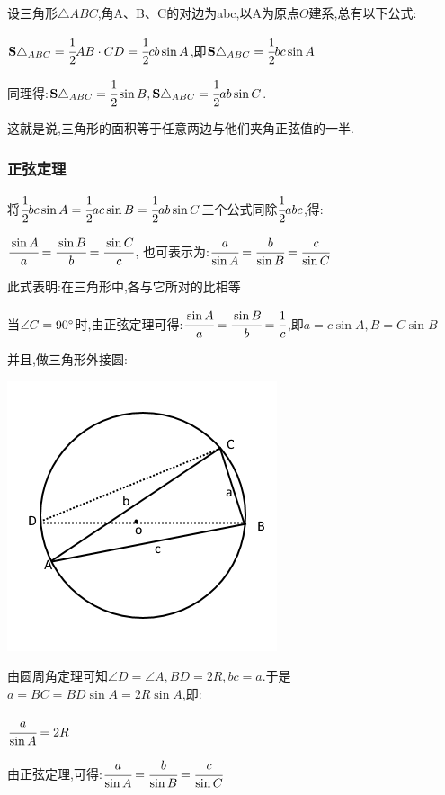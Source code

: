 {{设三角形$\triangle ABC$,角A、B、C的对边为abc,以A为原点$O$建系,总有以下公式:

$\mathbf{S}\triangle_{ABC} = \cfrac{1}{2}AB \cdot CD = \cfrac{1}{2}cb\sin A$,即$\mathbf{S}\triangle_{ABC} = \cfrac{1}{2}bc\sin A$

同理得:$\mathbf{S}\triangle_{ABC} = \cfrac{1}{2}\sin B, \mathbf{S}\triangle_{ABC} = \cfrac{1}{2}ab\sin C$.

这就是说,三角形的面积等于任意两边与他们夹角正弦值的一半.

\subsubsection{正弦定理}
将$\cfrac{1}{2}bc\sin A = \cfrac{1}{2}ac\sin B = \cfrac{1}{2}ab\sin C$三个公式同除$\cfrac{1}{2}abc$,得:

$\cfrac{\sin A}{a} = \cfrac{\sin B}{b} = \cfrac{\sin C}{c}$, 也可表示为:$\cfrac{a}{\sin A} = \cfrac{b}{\sin B} = \cfrac{c}{\sin C}$

此式表明:在三角形中,各{}与它所对{}的比相等

当$\angle C = 90^\circ$时,由正弦定理可得:$\cfrac{\sin A}{a} = \cfrac{\sin B}{b} = \cfrac{1}{c}$,即$a = c\sin A,B = C\sin B$

并且,做三角形外接圆:

\begin{center}
  \includegraphics[scale=0.5]{resources/insideTriangleAndCircleOutSide.png}
\end{center}

由圆周角定理可知$\angle D = \angle A,BD = 2R,bc = a$.于是$a = BC = BD\sin A = 2R\sin A$,即:

$\cfrac{a}{\sin A} = 2R$

由正弦定理,可得:$\cfrac{a}{\sin A} = \cfrac{b}{\sin B} = \cfrac{c}{\sin C}$

}}
